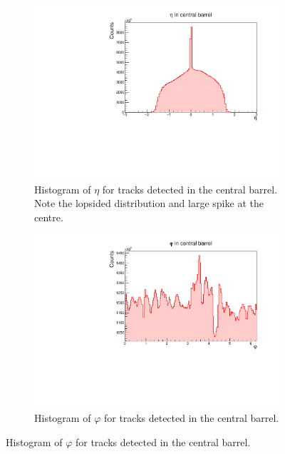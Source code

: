 \begin{figure}[h]%
    \centering
    \begin{subfigure}[t]{.49\linewidth}
        \centering
        \includegraphics[width=\linewidth]{Plots/pass4_TracksIU_nohasITS/eta.pdf}
        \caption{Histogram of $\eta$ for tracks detected in the central barrel. Note the lopsided distribution and large spike at the centre.}
        \label{fig:nohasITS_eta}
    \end{subfigure}
    \hfill
    \begin{subfigure}[t]{.49\linewidth}
        \centering
        \includegraphics[width=\linewidth]{Plots/pass4_TracksIU_nohasITS/phi.pdf}
        \caption{Histogram of $\varphi$ for tracks detected in the central barrel.}
        \label{fig:nohasITS_phi}
    \end{subfigure}

\end{figure}
